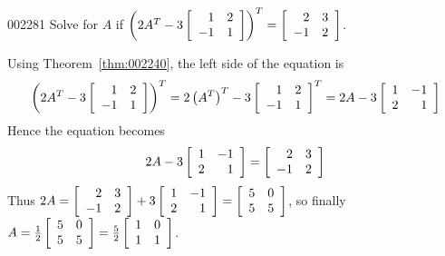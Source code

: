 \begin{example}{}{002281}
Solve for $A$ if $\left(2A^{T} - 3 \left[ \begin{array}{rr}
1 & 2 \\
-1 & 1
\end{array} \right] \right)^{T} = \left[ \begin{array}{rr}
2 & 3 \\
-1 & 2
\end{array} \right]$.


\begin{solution}
  Using Theorem~\ref{thm:002240}, the left side of the equation is
\begin{equation*}
\left(2A^{T} - 3 \left[ \begin{array}{rr}
1 & 2 \\
-1 & 1
\end{array} \right]\right)^{T} = 2\left(A^{T}\right)^{T} - 3 \left[ \begin{array}{rr}
1 & 2 \\
-1 & 1
\end{array} \right]^{T} = 2A - 3 \left[ \begin{array}{rr}
1 & -1 \\
2 & 1
\end{array} \right]
\end{equation*}
Hence the equation becomes
\begin{equation*}
2A  -  3 \left[ \begin{array}{rr}
1 & -1 \\
2 & 1
\end{array} \right] = \left[ \begin{array}{rr}
2 & 3 \\
-1 & 2
\end{array} \right]
\end{equation*}
Thus 
$2A = \left[ \begin{array}{rr}
2 & 3 \\
-1 & 2
\end{array} \right] + 3 \left[ \begin{array}{rr}
1 & -1 \\
2 & 1
\end{array} \right] = \left[ \begin{array}{rr}
5 & 0 \\
5 & 5
\end{array} \right]$, so finally 
$A = \tfrac{1}{2} \left[ \begin{array}{rr}
5 & 0 \\
5 & 5
\end{array} \right] = \tfrac{5}{2} \left[ \begin{array}{rr}
1 & 0 \\
1 & 1
\end{array} \right]$.
\end{solution}
\end{example}

